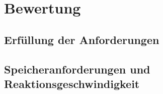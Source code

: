 \chapter{Bewertung}
\label{bewertung}

\section{Erfüllung der Anforderungen}

\section{Speicheranforderungen und Reaktionsgeschwindigkeit}
